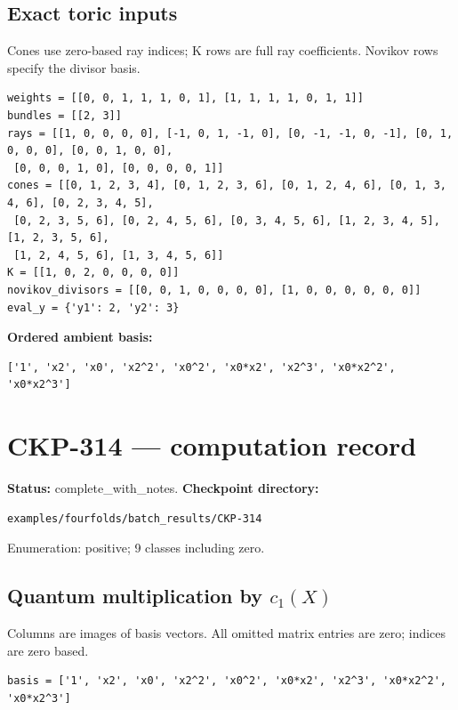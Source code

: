\documentclass[10pt,a4paper]{article}
\begin{document}
\subsection*{Exact toric inputs}
Cones use zero-based ray indices; K rows are full ray coefficients. Novikov rows specify the divisor basis.

\begin{lstlisting}
weights = [[0, 0, 1, 1, 1, 0, 1], [1, 1, 1, 1, 0, 1, 1]]
bundles = [[2, 3]]
rays = [[1, 0, 0, 0, 0], [-1, 0, 1, -1, 0], [0, -1, -1, 0, -1], [0, 1, 0, 0, 0], [0, 0, 1, 0, 0],
 [0, 0, 0, 1, 0], [0, 0, 0, 0, 1]]
cones = [[0, 1, 2, 3, 4], [0, 1, 2, 3, 6], [0, 1, 2, 4, 6], [0, 1, 3, 4, 6], [0, 2, 3, 4, 5],
 [0, 2, 3, 5, 6], [0, 2, 4, 5, 6], [0, 3, 4, 5, 6], [1, 2, 3, 4, 5], [1, 2, 3, 5, 6],
 [1, 2, 4, 5, 6], [1, 3, 4, 5, 6]]
K = [[1, 0, 2, 0, 0, 0, 0]]
novikov_divisors = [[0, 0, 1, 0, 0, 0, 0], [1, 0, 0, 0, 0, 0, 0]]
eval_y = {'y1': 2, 'y2': 3}
\end{lstlisting}

\textbf{Ordered ambient basis:}
\begin{lstlisting}
['1', 'x2', 'x0', 'x2^2', 'x0^2', 'x0*x2', 'x2^3', 'x0*x2^2', 'x0*x2^3']
\end{lstlisting}

\clearpage\section*{CKP-314 --- computation record}
\textbf{Status:} complete\_with\_notes.
\textbf{Checkpoint directory:}
\begin{lstlisting}
examples/fourfolds/batch_results/CKP-314
\end{lstlisting}

Enumeration: positive; 9 classes including zero.
\subsection*{Quantum multiplication by $c_1(X)$}
Columns are images of basis vectors. All omitted matrix entries are zero; indices are zero based.

\begin{lstlisting}
basis = ['1', 'x2', 'x0', 'x2^2', 'x0^2', 'x0*x2', 'x2^3', 'x0*x2^2', 'x0*x2^3']
\end{lstlisting}
\end{document}
